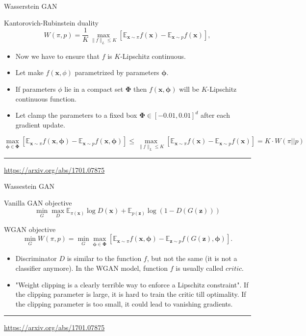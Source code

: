 \documentclass{beamer}
\newcommand{\bx}{\mathbf{x}}
\newcommand{\bz}{\mathbf{z}}
\newcommand{\bbE}{\mathbb{E}}
\newcommand{\bphi}{\boldsymbol{\phi}}
\begin{document}
\begin{frame}{Wasserstein GAN}
		\begin{block}{Kantorovich-Rubinstein duality}
		\[
			W(\pi, p) = \frac{1}{K} \max_{\| f \|_L \leq K} \left[ \bbE_{\bx \sim \pi} f(\bx)  - \bbE_{\bx \sim p} f(\bx)\right],
		\]
	\end{block}
	\begin{itemize}
		\item Now we have to ensure that $f$ is $K$-Lipschitz continuous.
		\item Let make $f(\bx, \phi)$ parametrized by parameters $\bphi$.
		\item If parameters $\phi$ lie in a compact set $\boldsymbol{\Phi}$ then $f(\bx, \bphi)$ will be $K$-Lipschitz continuous function. 
		\item Let clamp the parameters to a fixed box $\boldsymbol{\Phi} \in [-0.01, 0.01]^d$ after each gradient update.
	\end{itemize}
	{\footnotesize
	\[
		 \max_{\bphi \in \boldsymbol{\Phi}} \left[ \bbE_{\bx \sim \pi} f(\bx, \bphi)  - \bbE_{\bx \sim p} f(\bx, \bphi )\right] \leq  \max_{\| f \|_L \leq K} \left[ \bbE_{\bx \sim \pi} f(\bx)  - \bbE_{\bx \sim p} f(\bx)\right] = K \cdot W(\pi || p)
	\]}
	\vfill
	\hrule\medskip 
	{\scriptsize \href{https://arxiv.org/abs/1701.07875}{https://arxiv.org/abs/1701.07875}}
\end{frame}
\begin{frame}{Wassestein GAN}
	\begin{block}{Vanilla GAN objective}
		\vspace{-0.3cm}
		\[
			\min_{G} \max_D \bbE_{\pi(\bx)} \log D(\bx) + \bbE_{p(\bz)} \log (1 - D(G(\bz)))
		\]
	\end{block}
	\begin{block}{WGAN objective}
		\vspace{-0.6cm}
		\[
		\min_{G} W(\pi, p) = \min_{G} \max_{\bphi \in \boldsymbol{\Phi}} \left[ \bbE_{\bx \sim \pi} f(\bx, \bphi)  - \bbE_{\bz \sim p} f(G(\bz), \bphi )\right].
		\]
	\end{block}
	\begin{itemize}
		\item Discriminator $D$ is similar to the function $f$, but not the same (it is not a classifier anymore). In the WGAN model, function $f$ is usually called $\textit{critic}$.
		\item "Weight clipping is a clearly terrible way to enforce a Lipschitz constraint". If the clipping parameter is large, it is hard to train the critic till optimality. If the clipping parameter is too small, it could lead to vanishing gradients.
	\end{itemize}
	\vfill
	\hrule\medskip 
	{\scriptsize \href{https://arxiv.org/abs/1701.07875}{https://arxiv.org/abs/1701.07875}}
\end{frame}
\end{document}

